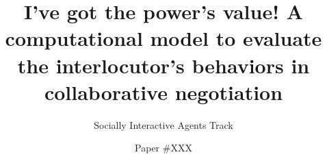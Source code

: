 \documentclass[sigconf]{aamas}  %
\begin{document}
	
	\title{I've got the power's value! A computational model to evaluate the interlocutor's behaviors in collaborative negotiation}  %
	
	\subtitle{Socially Interactive Agents Track}
	
	
	
	\author{Paper \#XXX}  %
	
	
\end{document}
